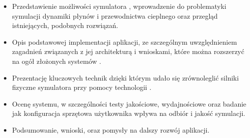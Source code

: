 \begin{itemize} \item Przedstawienie możliwości symulatora \en, wprowadzenie
do problematyki symulacji dynamiki płynów i przewodnictwa cieplnego oraz
przegląd istniejących, podobnych rozwiązań.

\item Opis podstawowej implementacji aplikacji, ze szczególnym uwzględnieniem
zagadnień związanych z jej architekturą i wnioskami, które można rozszerzyć na
ogół złożonych systemów .

\item Prezentację kluczowych technik dzięki którym udało się zrównoleglić
silniki fizyczne symulatora \en przy pomocy technologii .

\item Ocenę systemu, w szczególności testy jakościowe, wydajnościowe oraz
badanie jak konfiguracja sprzętowa użytkownika wpływa na odbiór i jakość
symulacji.

\item Podsumowanie, wnioski, oraz pomysły na dalszy rozwój aplikacji.
\end{itemize}
